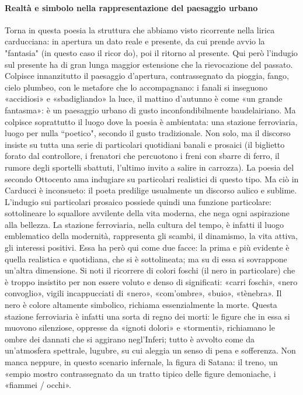 \documentclass{book}
\begin{document}
\paragraph{Realtà e simbolo nella rappresentazione del paesaggio urbano} Torna in questa poesia la struttura che abbiamo visto ricorrente nella lirica carducciana: in apertura un dato reale e presente, da cui prende avvio la "fantasia" (in questo caso il ricor do), poi il ritorno al presente. Qui però l'indugio sul presente ha di gran lunga maggior estensione che la rievocazione del passato. Colpisce innanzitutto il paesaggio d'apertura, contrassegnato da pioggia, fango, cielo plumbeo, con le metafore che lo accompagnano: i fanali si inseguono «accidiosi» e «sbadigliando» la luce, il mattino d'autunno è come «un grande fantasma»: è un paesaggio urbano di gusto inconfondibilmente baudelairiano.
Ma colpisce soprattutto il luogo dove la poesia è ambientata: una stazione ferroviaria, luogo per nulla “poetico", secondo il gusto tradizionale. Non solo, ma il discorso insiste su tutta una serie di particolari quotidiani banali e prosaici (il biglietto forato dal controllore, i frenatori che percuotono i freni con sbarre di ferro, il rumore degli sportelli sbattuti, l'ultimo invito a salire in carrozza). La poesia del secondo Ottocento ama indugiare su particolari realistici di questo tipo. Ma ciò in Carducci è inconsueto: il poeta predilige usualmente un discorso aulico e sublime. L'indugio sui particolari prosaico possiede quindi una funzione particolare: sottolineare lo squallore avvilente della vita moderna, che nega ogni aspirazione alla bellezza. La stazione ferroviaria, nella cultura del tempo, è infatti il luogo emblematico della modernità, rappresenta gli scambi, il dinamismo, la vita attiva, gli interessi positivi. Essa ha però qui come due facce: la prima e più evidente è quella realistica e quotidiana, che si è sottolineata; ma su di essa si sovrappone un'altra dimensione. Si noti il ricorrere di colori foschi (il nero in particolare) che è troppo insistito per non essere voluto e denso di significati: «carri foschi», «nero convoglio», vigili incappucciati di «nero», «com'ombre», «buio», «tènebra». Il nero è colore altamente simbolico, richiama essenzialmente la morte. Questa stazione ferroviaria è infatti una sorta di regno dei morti: le figure che in essa si muovono silenziose, oppresse da «ignoti dolori» e «tormenti», richiamano le ombre dei dannati che si aggirano negl'Inferi; tutto è avvolto come da un'atmosfera spettrale, lugubre, su cui aleggia un senso di pena e sofferenza. Non manca neppure, in questo scenario infernale, la figura di Satana: il treno, un «empio mostro contrassegnato da un tratto tipico delle figure demoniache, i «fiammei / occhi».
\end{document}
